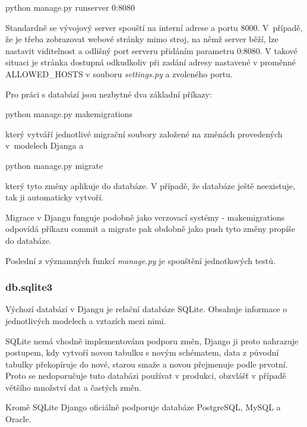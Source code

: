 \begin{center}
\textsf{python manage.py runserver 0:8080}
\end{center}

Standardně se vývojový server spouští na interní  adrese a
portu 8000. V~případě, že je třeba zobrazovat webové stránky mimo
stroj, na němž server běží, lze nastavit viditelnost a odlišný port
serveru přidáním parametru \textsf{0:8080}. V takové situaci je
stránka dostupná odkudkoliv při zadání adresy nastavené v proměnné
\textsf{ALLOWED\_HOSTS} v souboru \textit{settings.py} a zvoleného
portu.

Pro práci s databází jsou nezbytné dva základní příkazy:

\begin{center}
\textsf{python manage.py makemigrations}
\end{center}

který vytváří jednotlivé migrační soubory založené na změnách
provedených v~modelech Djanga a

\begin{center}
\textsf{python manage.py migrate}
\end{center}

který tyto změny aplikuje do databáze. V případě, že databáze ještě
neexistuje, tak ji automaticky vytvoří.

Migrace v Djangu funguje podobně jako verzovací systémy -
\textsf{makemigrations} odpovídá příkazu \textsf{commit} a
\textsf{migrate} pak obdobně jako \textsf{push} tyto změny propíše do
databáze.

Poslední z významných funkcí \textit{manage.py} je spouštění
jednotkových testů.

\subsubsection{db.sqlite3}
Výchozí databází v Djangu je relační databáze SQLite. Obsahuje
informace o jednotlivých modelech a vztazích mezi nimi.

SQLite nemá vhodně implementovánu podporu změn, Django ji proto
nahrazuje postupem, kdy vytvoří novou tabulku s novým schématem, data
z původní tabulky překopíruje do nové, starou smaže a novou přejmenuje
podle prvotní. Proto se nedoporučuje tuto databázi používat v
produkci, obzvlášť v případě většího množství dat a častých změn.

Kromě SQLite Django oficiálně podporuje databáze PostgreSQL, MySQL a
Oracle.

